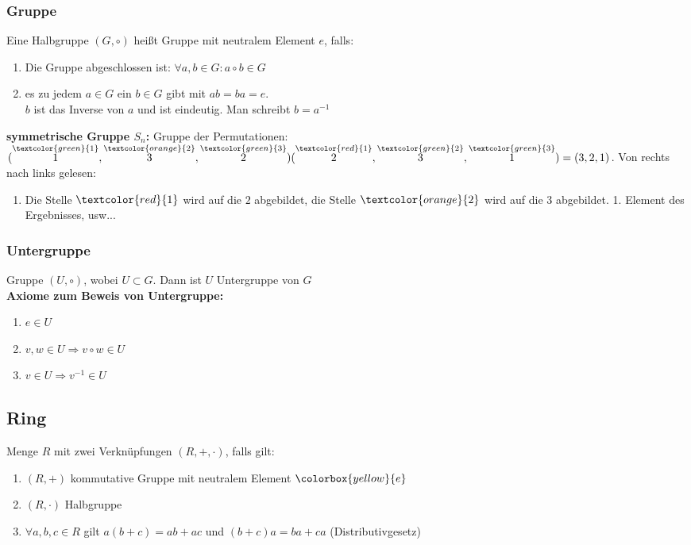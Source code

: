 \documentclass[german, fourcolumn, 8pt]{latex4ei/latex4ei_sheet}
\begin{document}
\begin{sectionbox}
    \subsubsection{Gruppe}
    Eine Halbgruppe $(G, \circ)$ heißt Gruppe mit neutralem Element $e$, falls:
    \begin{enumerate}
        \item Die Gruppe abgeschlossen ist: $\forall a,b \in G:a \circ b \in G$
        \item  es zu jedem $a \in G$ ein $b\in G$ gibt mit $ab=ba=e$.\\
              $b$ ist das Inverse von $a$ und ist eindeutig. Man schreibt $b=a^{-1}$
    \end{enumerate}
    \textbf{symmetrische Gruppe $S_n$:} Gruppe der Permutationen:\\
    $(\overset{\textcolor{green}{1}}{1}, \overset{\textcolor{orange}{2}}{3}, \overset{\textcolor{green}{3}}{2})(\overset{\textcolor{red}{1}}{2}, \overset{\textcolor{green}{2}}{3}, \overset{\textcolor{green}{3}}{1})=(3,2,1)$.
    Von rechts nach links gelesen:
    \begin{enumerate}
        \item Die Stelle $\textcolor{red}{1}$ wird auf die $2$ abgebildet, die Stelle $\textcolor{orange}{2}$ wird auf die $3$ abgebildet. 1. Element des Ergebnisses, usw...
    \end{enumerate}
\end{sectionbox}

\begin{sectionbox}
    \subsubsection{Untergruppe}
    Gruppe $(U, \circ)$, wobei $U \subset G$. Dann ist $U$ Untergruppe von $G$ \\
    \textbf{Axiome zum Beweis von Untergruppe:}
    \begin{enumerate}
        \item $e \in U$
        \item $v,w \in U \Rightarrow v\circ w \in U$
        \item $v \in U \Rightarrow v^{-1} \in U$
    \end{enumerate}
\end{sectionbox}

\begin{sectionbox}
    \subsection{Ring}
    Menge $R$ mit zwei Verknüpfungen $(R, +, \cdot)$, falls gilt:
    \begin{enumerate}
        \item $(R, +)$ kommutative Gruppe mit neutralem Element $\colorbox{yellow}{e}$
        \item $(R, \cdot)$ Halbgruppe
        \item $\forall a,b,c \in R$ gilt $a(b+c)=ab+ac$ und $(b+c)a=ba+ca$ (Distributivgesetz)
    \end{enumerate}
\end{sectionbox}
\end{document}
